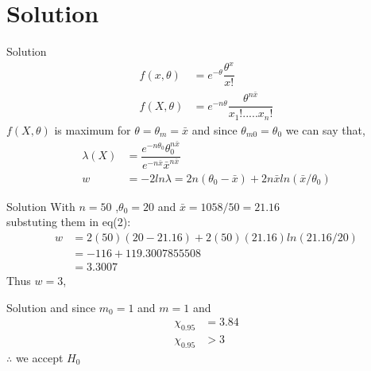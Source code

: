 \documentclass{beamer}
\providecommand{\brak}[1]{\ensuremath{\left(#1\right)}}
\begin{document}
    \section{Solution}
        \begin{frame}{Solution}
	\begin{align*}
	f \brak{x, \theta} &= e^{- \theta} \dfrac{\theta^{x}}{x!} \\[9pt]
	f \brak{X, \theta} &= e^{-n \theta} \dfrac{\theta^{n \bar{x}}}{x_1!.....x_n!}
	\end{align*}	        
     $f \brak{X, \theta}$ is maximum for $ \theta = \theta_m = \bar{x}$ and 
     since $ \theta_{m0} = \theta_{0}$ we can say that,
     \begin{align}
     \lambda \brak{X} &= \dfrac{e^{- n \theta_0 } \theta_0^{n \bar{x}}}{e^{-n \bar{x}} \bar{x}^{n \bar{x}}} \\[9pt]
     w &= - 2 ln \lambda = 2n(\theta_0 - \bar{x}) + 2n \bar{x} ln(\bar{x}/ \theta_0)
     \end{align}
        \end{frame}
    \begin{frame}{Solution}
   With $n=50$ ,$\theta_0 = 20$ and $\bar{x}=1058/50 = 21.16$ \\[9pt]
   substuting them in eq(2):
   \\[9pt]
   \begin{align*}
   w &= 2(50)(20-21.16) + 2(50)(21.16)ln(21.16/20)\\[9pt]
   &= -116 + 119.3007855508\\[9pt]
   &= 3.3007
   \end{align*}
   Thus $w=3$,
    \end{frame}
    \begin{frame}{Solution}
    and since $m_0=1$ and $m=1$ and%
\begin{align*}
\chi_{0.95} &= 3.84\\
 \chi_{0.95} & > 3
\end{align*}   
$\therefore$  we accept $H_0$
    
    \end{frame}
    
    
\end{document}
